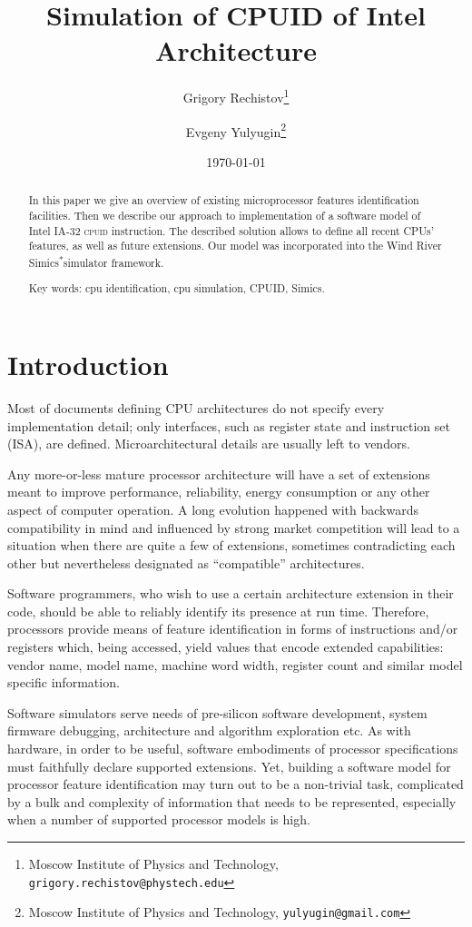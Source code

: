 \documentclass[a4paper,10pt,oneside,unicode]{article}
\author{Grigory Rechistov\thanks{Moscow Institute of Physics and Technology, \texttt{grigory.rechistov@phystech.edu}} \and Evgeny Yulyugin\thanks{Moscow Institute of Physics and Technology, \texttt{yulyugin@gmail.com}}}
\title{Simulation of CPUID of Intel Architecture}
\date{\today}
\newcommand{\cpuid}{\textsc{cpuid} }
\newcommand{\othercopyright}{\textsuperscript{*}}
\begin{document}
\maketitle

\tableofcontents

\begin{abstract}
    
   \noindent In this paper we give an overview of existing microprocessor features identification facilities. Then we describe our approach to implementation of a software model of Intel IA-32 \cpuid instruction. The described solution allows to define all recent {CPUs}' features, as well as future extensions. Our model was incorporated into the Wind River Simics\othercopyright simulator framework.
    
    \noindent Key words: cpu identification, cpu simulation, CPUID, Simics.
\end{abstract}

\section {Introduction}

Most of documents defining CPU architectures do not specify every implementation detail; only interfaces, such as register state and instruction set (ISA), are defined. Microarchitectural details are usually left to vendors.

Any more-or-less mature processor architecture will have a set of extensions meant to improve performance, reliability, energy consumption or any other aspect of computer operation. A long evolution happened with backwards compatibility in mind and influenced by strong market competition will lead to a situation when there are quite a few of extensions, sometimes contradicting each other but nevertheless designated as “compatible” architectures.

Software programmers, who wish to use a certain architecture extension in their code, should be able to reliably identify its presence at run time. Therefore, processors provide means of feature identification in forms of instructions and/or registers which, being accessed, yield values that encode extended capabilities: vendor name, model name, machine word width, register count and similar model specific information.

Software simulators serve needs of pre-silicon software development, system firmware debugging, architecture and algorithm exploration etc. As with hardware, in order to be useful, software embodiments of processor specifications must faithfully declare supported extensions. Yet, building a software model for processor feature identification may turn out to be a non-trivial task, complicated by a bulk and complexity of information that needs to be represented, especially when a number of supported processor models is high. 
\end{document}
